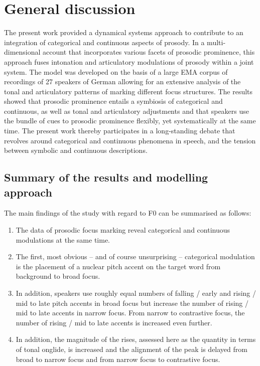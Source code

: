 \chapter{General discussion}
\label{chapter_discussion}

The present work provided a dynamical systems approach to contribute to an integration of categorical and continuous aspects of prosody. In a multi-dimension\-al account that incorporates various facets of prosodic prominence, this approach fuses intonation and articulatory modulations of prosody within a joint system. The model was developed on the basis of a large EMA corpus of recordings of 27 speakers of German allowing for an extensive analysis of the tonal and articulatory patterns of marking different focus structures. The results showed that prosodic prominence entails a symbiosis of categorical and continuous, as well as tonal and articulatory adjustments and that speakers use the bundle of cues to prosodic prominence flexibly, yet systematically at the same time. The present work thereby participates in a long-standing debate that revolves around categorical and continuous phenomena in speech, and the tension between symbolic and continuous descriptions.

\section{Summary of the results and modelling approach}

The main findings of the study with regard to F0 can be summarised as follows:

\begin{enumerate}

\item The data of prosodic focus marking reveal categorical and continuous modulations at the same time.

\item The first, most obvious – and of course unsurprising – categorical modulation is the placement of a nuclear pitch accent on the target word from background to broad focus.

\item In addition, speakers use roughly equal numbers of falling / early and rising / mid to late pitch accents in broad focus but increase the number of rising / mid to late accents in narrow focus. From narrow to contrastive focus, the number of rising / mid to late accents is increased even further.

\item In addition, the magnitude of the rises, assessed here as the quantity in terms of tonal onglide, is increased and the alignment of the peak is delayed from broad to narrow focus and from narrow focus to contrastive focus.

\end{enumerate}

